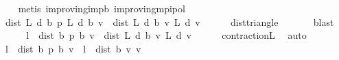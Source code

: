 \begin{isabellebody}
\ \ \ \ \isamarkupfalse%
\ {\isacharparenleft}{\kern0pt}metis\ {\isasymnu}{\isacharunderscore}{\kern0pt}improving{\isacharunderscore}{\kern0pt}imp{\isacharunderscore}{\kern0pt}{\isasymL}\isactrlsub b\ {\isasymnu}{\isacharunderscore}{\kern0pt}improving{\isacharunderscore}{\kern0pt}mpi{\isacharunderscore}{\kern0pt}pol{\isacharparenright}{\kern0pt}\isanewline
\ \ \isamarkupfalse%
\ \isamarkupfalse%
\ {\isachardoublequoteopen}{\isasymdots}\ {\isasymle}\ dist\ {\isacharparenleft}{\kern0pt}L\ {\isacharquery}{\kern0pt}d\ {\isacharparenleft}{\kern0pt}{\isasymnu}\isactrlsub b\ {\isacharquery}{\kern0pt}p{\isacharparenright}{\kern0pt}{\isacharparenright}{\kern0pt}\ {\isacharparenleft}{\kern0pt}L\ {\isacharquery}{\kern0pt}d\ {\isacharparenleft}{\kern0pt}{\isasymL}\isactrlsub b\ {\isacharquery}{\kern0pt}v{\isacharparenright}{\kern0pt}{\isacharparenright}{\kern0pt}\ {\isacharplus}{\kern0pt}\ dist\ {\isacharparenleft}{\kern0pt}L\ {\isacharquery}{\kern0pt}d\ {\isacharparenleft}{\kern0pt}{\isasymL}\isactrlsub b\ {\isacharquery}{\kern0pt}v{\isacharparenright}{\kern0pt}{\isacharparenright}{\kern0pt}\ {\isacharparenleft}{\kern0pt}L\ {\isacharquery}{\kern0pt}d\ {\isacharquery}{\kern0pt}v{\isacharparenright}{\kern0pt}{\isachardoublequoteclose}\isanewline
\ \ \ \ \isamarkupfalse%
\ dist{\isacharunderscore}{\kern0pt}triangle\ \isanewline
\ \ \ \ \isamarkupfalse%
\ blast\isanewline
\ \ \isamarkupfalse%
\ \isamarkupfalse%
\ {\isachardoublequoteopen}{\isasymdots}\ {\isasymle}\ l\ {\isacharasterisk}{\kern0pt}\ dist\ {\isacharparenleft}{\kern0pt}{\isasymnu}\isactrlsub b\ {\isacharquery}{\kern0pt}p{\isacharparenright}{\kern0pt}\ {\isacharparenleft}{\kern0pt}{\isasymL}\isactrlsub b\ {\isacharquery}{\kern0pt}v{\isacharparenright}{\kern0pt}\ {\isacharplus}{\kern0pt}\ dist\ {\isacharparenleft}{\kern0pt}L\ {\isacharquery}{\kern0pt}d\ {\isacharparenleft}{\kern0pt}{\isasymL}\isactrlsub b\ {\isacharquery}{\kern0pt}v{\isacharparenright}{\kern0pt}{\isacharparenright}{\kern0pt}\ {\isacharparenleft}{\kern0pt}L\ {\isacharquery}{\kern0pt}d\ {\isacharquery}{\kern0pt}v{\isacharparenright}{\kern0pt}{\isachardoublequoteclose}\isanewline
\ \ \ \ \isamarkupfalse%
\ contraction{\isacharunderscore}{\kern0pt}L\ \isamarkupfalse%
\ auto\isanewline
\ \ \isamarkupfalse%
\ \isamarkupfalse%
\ {\isachardoublequoteopen}{\isasymdots}\ {\isasymle}\ l\ {\isacharasterisk}{\kern0pt}\ dist\ {\isacharparenleft}{\kern0pt}{\isasymnu}\isactrlsub b\ {\isacharquery}{\kern0pt}p{\isacharparenright}{\kern0pt}\ {\isacharparenleft}{\kern0pt}{\isasymL}\isactrlsub b\ {\isacharquery}{\kern0pt}v{\isacharparenright}{\kern0pt}\ {\isacharplus}{\kern0pt}\ l\ {\isacharasterisk}{\kern0pt}\ dist\ {\isacharparenleft}{\kern0pt}{\isasymL}\isactrlsub b\ {\isacharquery}{\kern0pt}v{\isacharparenright}{\kern0pt}\ {\isacharquery}{\kern0pt}v{\isachardoublequoteclose}\isanewline

\end{isabellebody}

